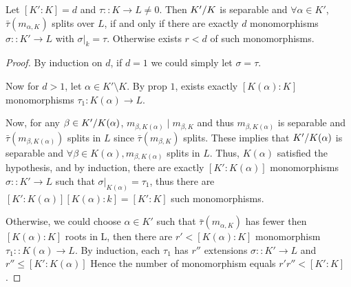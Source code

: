 \begin{prop}\label{prop:separable-field-split-have-most-embeddings}
  Let $[K': K] = d$ and $\tau:: K \to L \neq 0$. Then ${K'}/{K}$ is separable and $\forall \alpha \in K'$,
  $\bar\tau(m_{\alpha, K})$ splits over $L$, if and only if there are exactly
  $d$ monomorphisms $\sigma::K' \to L$ with $\sigma\big|_k = \tau$.
  Otherwise exists $r < d$ of such monomorphisms.

  \begin{proof}
    By induction on $d$, if $d = 1$ we could simply let $\sigma = \tau$.

    Now for $d > 1$, let $\alpha \in K' \setminus K$.
    By prop $1$, exists exactly $[K(\alpha): K]$ monomorphisms $\tau_1: K(\alpha) \to L$.

    Now, for any $\beta \in {K'}/{K(\alpha)}$,
    $m_{\beta, K(\alpha)} \mid m_{\beta, K}$ and thus $m_{\beta, K(\alpha)}$ is separable
    and $\bar\tau(m_{\beta, K(\alpha)})$ splits in $L$ since $\bar\tau(m_{\beta, K})$ splits.
    These implies that ${K'}/{K(\alpha)}$ is separable and $\forall \beta \in K(\alpha),
    m_{\beta, K(\alpha)}$ splits in $L$. Thus, $K(\alpha)$ satisfied the hypothesis,
    and by induction, there are exactly $[K': K(\alpha)]$ monomorphisms $\sigma :: K' \to L$
    such that $\sigma\big|_{K(\alpha)} = \tau_1$, thus there are $[K': K(\alpha)][K(\alpha): k]
    = [K': K]$ such monomorphisms.

    Otherwise, we could choose $\alpha \in K'$ such that $\bar\tau(m_{\alpha, K})$ has fewer
    then $[K(\alpha): K]$ roots in L, then there are $r' < [K(\alpha): K]$ monomorphism $\tau_1 :: K(\alpha)
    \to L$. By induction, each $\tau_1$ has $r''$ extensions $\sigma :: K' \to L$ and $r'' \leq [K': K(\alpha)]$
    Hence the number of monomorphism equals $r' r'' < [K': K]$.
  \end{proof}
\end{prop}

